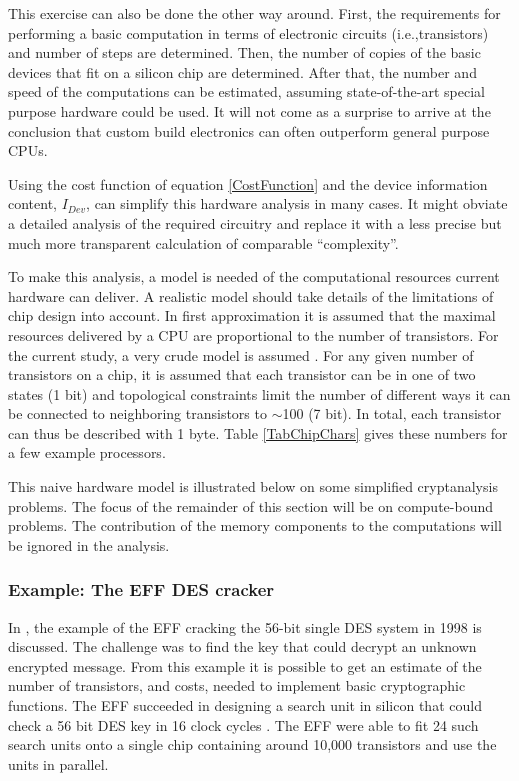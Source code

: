 \documentclass{article}
\begin{document}
This exercise can also be done the other way around. 
First, the requirements for performing a basic computation in terms of electronic
circuits (i.e.,transistors) and number of steps are determined. Then, the
number of copies of the basic devices that fit on a silicon chip are determined.  After that,
the number and speed of the computations can be estimated, assuming 
state-of-the-art special purpose hardware could be used. It will not come as a surprise
to arrive at the conclusion that custom build electronics can often outperform
general purpose CPUs. 

Using the cost function of equation \ref{CostFunction}
and the device information content, $I_{Dev}$, can simplify this 
hardware analysis in many cases. It might obviate a
detailed analysis of the required circuitry and replace it with a less precise
but much more transparent calculation of comparable ``complexity''.

To make this analysis, a model is needed of the computational resources current hardware 
can deliver. A realistic model should take details of the limitations of chip design into 
account. In first approximation it is assumed that the maximal resources delivered by a CPU 
are proportional to the number of transistors. For the current study, a very crude model is assumed 
\cite{Son0911-5262}. For any given number of transistors on a chip, it is assumed that each 
transistor can be in one of two states (1 bit) and topological constraints limit the number of
different ways it can be connected to neighboring transistors to $\sim$100 (7 bit). In total, 
each transistor can thus be described with 1 byte.  Table \ref{TabChipChars} gives these numbers
for a few example processors.

This naive hardware model is illustrated below on some simplified cryptanalysis problems. 
The focus of the remainder of this section will be on compute-bound problems. The 
contribution of the memory components to the computations will be ignored in the analysis.

\subsubsection{Example: The EFF DES cracker}\label{SectEFFDESS}

In \cite{Son0911-5262}, the example of the EFF cracking the 56-bit single DES system in 
1998 \cite{EFF-DES,DEScracker:1998} is discussed. The challenge was to find the key that
could decrypt an unknown encrypted message.
From this example it is possible to get an
estimate of the number of transistors, and costs, needed to implement basic cryptographic
functions. The EFF succeeded in designing a search unit in silicon that could check 
a 56 bit DES key in 16 clock cycles \cite{EFF-DES,DEScracker:1998}. The EFF were able to fit 24 
such search units onto a single chip containing around 10,000 transistors and use 
the units in parallel. 
\end{document}
